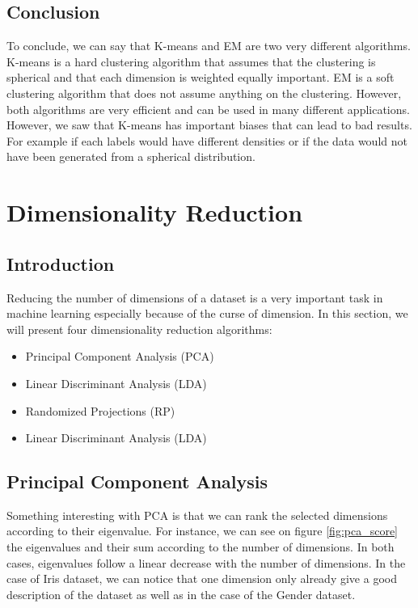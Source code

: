 \documentclass[twocolumn, 10pt]{article}
\begin{document}
		\subsection{Conclusion}
			To conclude, we can say that K-means and EM are two very different algorithms. K-means is a hard clustering algorithm that assumes that the clustering is spherical and that each dimension is weighted equally important. EM is a soft clustering algorithm that does not assume anything on the clustering. However, both algorithms are very efficient and can be used in many different applications. However, we saw that K-means has important biases that can lead to bad results. For example if each labels would have different densities or if the data would not have been generated from a spherical distribution.
	\section{Dimensionality Reduction}
		\subsection{Introduction}
			Reducing the number of dimensions of a dataset is a very important task in machine learning especially because of the curse of dimension. In this section, we will present four dimensionality reduction algorithms:
			\begin{itemize}
				\item Principal Component Analysis (PCA)
				\item Linear Discriminant Analysis (LDA)
				\item Randomized Projections (RP)
				\item Linear Discriminant Analysis (LDA)
			\end{itemize}
		\subsection{Principal Component Analysis}
			Something interesting with PCA is that we can rank the selected dimensions according to their eigenvalue. For instance, we can see on figure \ref{fig:pca_score} the eigenvalues and their sum according to the number of dimensions. In both cases, eigenvalues follow a linear decrease with the number of dimensions. In the case of Iris dataset, we can notice that one dimension only already give a good description of the dataset as well as in the case of the Gender dataset.
\end{document}
